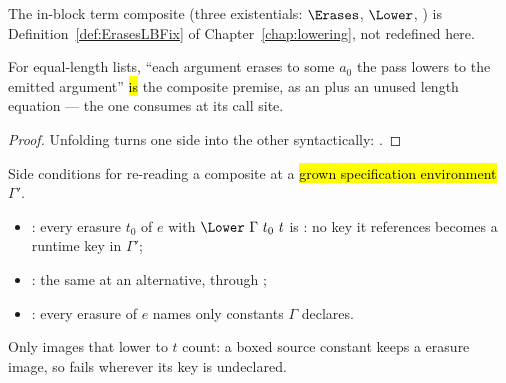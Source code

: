\begin{remark}
 The in-block term composite  (three existentials: $\Erases$, $\Lower$,
) is Definition~\ref{def:ErasesLBFix} of Chapter~\ref{chap:lowering}, not redefined
here.
\end{remark}

\begin{lemma}
\label{lem:erasesLB_of_spine}
\leanok
{}
 For equal-length lists, ``each argument erases to some $a_0$ the pass lowers to the
emitted argument'' \hl{is} the composite premise, as an  plus an unused length equation ---
the one  consumes at its call site.
\end{lemma}
\begin{proof}
\leanok
{}
 Unfolding  turns one side into the other syntactically: .
\end{proof}

\begin{definition}
\label{def:ErasuresStable}
\leanok
{}
 Side conditions for re-reading a composite at a \hl{grown specification environment}
$\Gamma'$.
\begin{itemize}
\item {}: every erasure $t_0$ of $e$ with $\Lower\ \Gamma\ t_0\ t$ is
: no key it references becomes a runtime key in $\Gamma'$;
\item {}: the same at an alternative, through ;
\item {}: every erasure of $e$ names only constants $\Gamma$ declares.
\end{itemize}
 Only images that lower to $t$ count: a boxed source constant keeps a  erasure
image, so  fails wherever its key is undeclared.
\end{definition}

